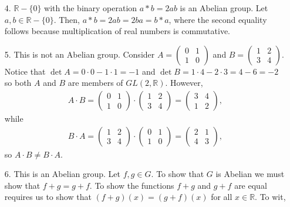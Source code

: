 \documentclass[12pt]{article}
\def\R{{\mathbb R}}        %
\numberwithin{theorem}{section}
\numberwithin{equation}{section}
\numberwithin{remark}{section}
\numberwithin{definition}{section}
\numberwithin{theorem}{section}
\numberwithin{lemma}{section}
\numberwithin{example}{section}
\begin{document}
\begin{itemize}
{\begin{itemize}
{				\begin{align*}
					(a_1,\ldots,a_n)*(b_1,\ldots,b_n)=(a_1+b_1,\ldots,a_n+b_n)&=(b_1+a_1,\ldots,b_n+a_n)\\
					&=(b_1,\ldots,b_n)*(a_1,\ldots,a_n),
				\end{align*}
			where the second equality follows because addition of real numbers is commutative.}
			\item[4.]{$\R-\{0\}$ with the binary operation $a*b=2ab$ is an Abelian group. Let $a,b\in\R-\{0\}$. Then, $a*b=2ab=2ba=b*a$, where the second equality follows because multiplication of real numbers is commutative.}
			\item[5.]{This is not an Abelian group. Consider $A=\begin{pmatrix}0 & 1\\ 1 & 0 \end{pmatrix}$ and $B=\begin{pmatrix}1 & 2\\ 3 & 4 \end{pmatrix}$. Notice that $\det{A}=0\cdot0-1\cdot1=-1$ and $\det{B}=1\cdot4-2\cdot3=4-6=-2$ so both $A$ and $B$ are members of $GL(2,\R)$. However,
				\begin{align*}
					A\cdot B = \begin{pmatrix}0 & 1\\ 1 & 0 \end{pmatrix} \cdot \begin{pmatrix}1 & 2\\ 3 & 4 \end{pmatrix} = \begin{pmatrix}3 & 4\\ 1 & 2 \end{pmatrix},
				\end{align*}
			while
				\begin{align*}
					B\cdot A =  \begin{pmatrix}1 & 2\\ 3 & 4 \end{pmatrix} \cdot \begin{pmatrix}0 & 1\\ 1 & 0 \end{pmatrix}= \begin{pmatrix}2 & 1\\ 4 & 3 \end{pmatrix},
			\end{align*}
			so $A\cdot B \neq B\cdot A$.}
			\item[6.]{This is an Abelian group. Let $f,g\in G$. To show that $G$ is Abelian we must show that $f+g=g+f$. To show the functions $f+g$ and $g+f$ are equal requires us to show that $(f+g)(x)=(g+f)(x)$ for all $x\in\R$. To wit,
}
\end{itemize}}
\end{itemize}
\end{document}
